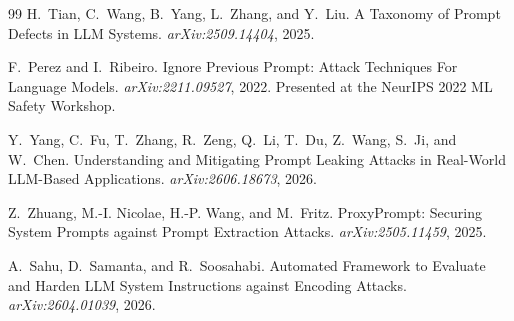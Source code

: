 \documentclass[11pt]{article}
\begin{document}
\begin{thebibliography}{99}
H.~Tian, C.~Wang, B.~Yang, L.~Zhang, and Y.~Liu. A Taxonomy of Prompt
Defects in LLM Systems. \emph{arXiv:2509.14404}, 2025.

F.~Perez and I.~Ribeiro. Ignore Previous Prompt: Attack Techniques For
Language Models. \emph{arXiv:2211.09527}, 2022. Presented at the NeurIPS
2022 ML Safety Workshop.

Y.~Yang, C.~Fu, T.~Zhang, R.~Zeng, Q.~Li, T.~Du, Z.~Wang, S.~Ji, and
W.~Chen. Understanding and Mitigating Prompt Leaking Attacks in
Real-World LLM-Based Applications. \emph{arXiv:2606.18673}, 2026.

Z.~Zhuang, M.-I. Nicolae, H.-P. Wang, and M.~Fritz. ProxyPrompt: Securing
System Prompts against Prompt Extraction Attacks. \emph{arXiv:2505.11459}, 2025.

A.~Sahu, D.~Samanta, and R.~Soosahabi. Automated Framework to Evaluate
and Harden LLM System Instructions against Encoding Attacks.
\emph{arXiv:2604.01039}, 2026.

\end{thebibliography}
\end{document}
